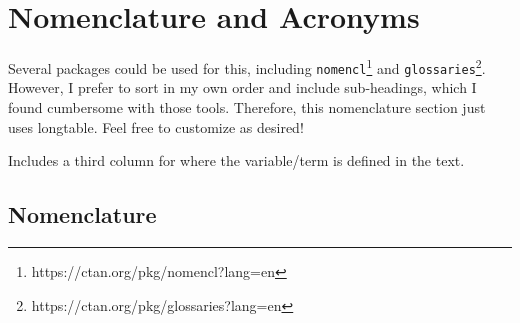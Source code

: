 \clearpage
\chapter{Nomenclature and Acronyms}
\label{sec:Nomenclature_and_Acronyms}

Several packages could be used for this, including \verb|nomencl|\footnote{https://ctan.org/pkg/nomencl?lang=en}
   and \verb|glossaries|\footnote{https://ctan.org/pkg/glossaries?lang=en}.
However, I prefer to sort in my own order and include sub-headings,
   which I found cumbersome with those tools.
Therefore, this nomenclature section just uses longtable.
Feel free to customize as desired!

Includes a third column for where the variable/term is defined in the text.

\section{Nomenclature}
\label{sec:Nomenclature}

